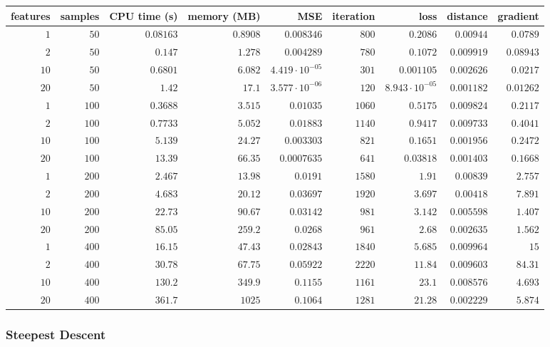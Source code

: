 \documentclass[12pt,a4paper]{article}
\begin{document}
\begin{tabular}
{r | r | r | r | r | r | r | r | r}
features & samples & CPU time (s) & memory (MB) & MSE & iteration & loss & distance & gradient \\
\hline
$1$ & $50$ & $0.08163$ & $0.8908$ & $0.008346$ & $800$ & $0.2086$ & $0.00944$ & $0.0789$ \\
$2$ & $50$ & $0.147$ & $1.278$ & $0.004289$ & $780$ & $0.1072$ & $0.009919$ & $0.08943$ \\
$10$ & $50$ & $0.6801$ & $6.082$ & $4.419 \cdot 10^{-05}$ & $301$ & $0.001105$ & $0.002626$ & $0.0217$ \\
$20$ & $50$ & $1.42$ & $17.1$ & $3.577 \cdot 10^{-06}$ & $120$ & $8.943 \cdot 10^{-05}$ & $0.001182$ & $0.01262$ \\
$1$ & $100$ & $0.3688$ & $3.515$ & $0.01035$ & $1060$ & $0.5175$ & $0.009824$ & $0.2117$ \\
$2$ & $100$ & $0.7733$ & $5.052$ & $0.01883$ & $1140$ & $0.9417$ & $0.009733$ & $0.4041$ \\
$10$ & $100$ & $5.139$ & $24.27$ & $0.003303$ & $821$ & $0.1651$ & $0.001956$ & $0.2472$ \\
$20$ & $100$ & $13.39$ & $66.35$ & $0.0007635$ & $641$ & $0.03818$ & $0.001403$ & $0.1668$ \\
$1$ & $200$ & $2.467$ & $13.98$ & $0.0191$ & $1580$ & $1.91$ & $0.00839$ & $2.757$ \\
$2$ & $200$ & $4.683$ & $20.12$ & $0.03697$ & $1920$ & $3.697$ & $0.00418$ & $7.891$ \\
$10$ & $200$ & $22.73$ & $90.67$ & $0.03142$ & $981$ & $3.142$ & $0.005598$ & $1.407$ \\
$20$ & $200$ & $85.05$ & $259.2$ & $0.0268$ & $961$ & $2.68$ & $0.002635$ & $1.562$ \\
$1$ & $400$ & $16.15$ & $47.43$ & $0.02843$ & $1840$ & $5.685$ & $0.009964$ & $15$ \\
$2$ & $400$ & $30.78$ & $67.75$ & $0.05922$ & $2220$ & $11.84$ & $0.009603$ & $84.31$ \\
$10$ & $400$ & $130.2$ & $349.9$ & $0.1155$ & $1161$ & $23.1$ & $0.008576$ & $4.693$ \\
$20$ & $400$ & $361.7$ & $1025$ & $0.1064$ & $1281$ & $21.28$ & $0.002229$ & $5.874$ \\
\end{tabular}


\subsubsection{Steepest Descent}
\end{document}
